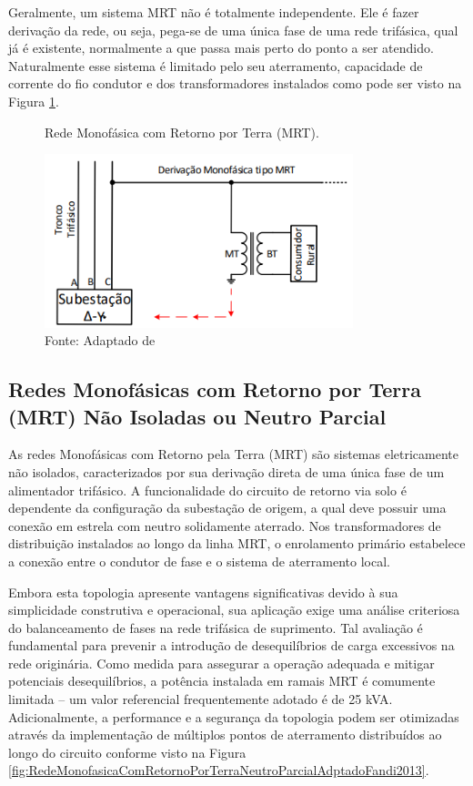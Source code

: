 \documentclass[oneside,openright,12pt]{ufsm_2021} %
\begin{document}
\par Geralmente, um sistema MRT não é totalmente independente. Ele é fazer derivação da rede, ou seja, pega-se de uma única fase de uma rede trifásica, qual já é existente, normalmente a que passa mais perto do ponto a ser atendido. Naturalmente esse sistema é limitado pelo seu aterramento, capacidade de corrente do fio condutor e dos transformadores instalados como pode ser visto na Figura \ref{fig:RedeMonofasicaComRetornoPorTerraAdptadoFandi2013}.

\begin{figure}[H]
	\centering
	\caption{Rede Monofásica com Retorno por Terra (MRT).}
	\includegraphics[width=0.8\textwidth]{figuras/Imagem1Fandi2013.png}
	\caption*{Fonte: Adaptado de \cite{fandi_sistema_2013}}
	\label{fig:RedeMonofasicaComRetornoPorTerraAdptadoFandi2013}
\end{figure}

\subsection{Redes Monofásicas com Retorno por Terra (MRT) Não Isoladas ou Neutro Parcial}

\par As redes Monofásicas com Retorno pela Terra (MRT) são sistemas eletricamente não isolados, caracterizados por sua derivação direta de uma única fase de um alimentador trifásico. A funcionalidade do circuito de retorno via solo é dependente da configuração da subestação de origem, a qual deve possuir uma conexão em estrela com neutro solidamente aterrado. Nos transformadores de distribuição instalados ao longo da linha MRT, o enrolamento primário estabelece a conexão entre o condutor de fase e o sistema de aterramento local.

\par Embora esta topologia apresente vantagens significativas devido à sua simplicidade construtiva e operacional, sua aplicação exige uma análise criteriosa do balanceamento de fases na rede trifásica de suprimento. Tal avaliação é fundamental para prevenir a introdução de desequilíbrios de carga excessivos na rede originária. Como medida para assegurar a operação adequada e mitigar potenciais desequilíbrios, a potência instalada em ramais MRT é comumente limitada – um valor referencial frequentemente adotado é de 25 kVA. Adicionalmente, a performance e a segurança da topologia podem ser otimizadas através da implementação de múltiplos pontos de aterramento distribuídos ao longo do circuito conforme visto na Figura \ref{fig:RedeMonofasicaComRetornoPorTerraNeutroParcialAdptadoFandi2013}.
\end{document}
